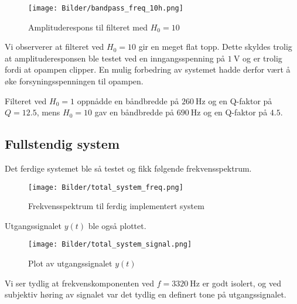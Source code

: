 \begin{figure}[H]
    \centering
    \texttt{[image: Bilder/bandpass\_freq\_10h.png]}
    \caption{Amplituderespons til filteret med $H_0 = 10$}
\end{figure}

Vi observerer at filteret ved $H_0 = 10$ gir en meget flat topp. Dette skyldes trolig at amplituderesponsen ble testet ved 
en inngangsspenning på $\SI{1}{\volt}$ og er trolig fordi at opampen clipper. En mulig forbedring av systemet hadde derfor vært 
å øke forsyningsspenningen til opampen.

Filteret ved $H_0 = 1$ oppnådde en båndbredde på $\SI{260}{\hertz}$ og en Q-faktor på $Q = 12.5$, mens 
$H_0 = 10$ gav en båndbredde på $\SI{690}{\hertz}$ og en Q-faktor på $4.5$. 

\subsection{Fullstendig system}
Det ferdige systemet ble så testet og fikk følgende frekvensspektrum.
\begin{figure}[H]
    \centering
    \texttt{[image: Bilder/total\_system\_freq.png]}
    \caption{Frekvensspektrum til ferdig implementert system}
\end{figure}

Utgangssignalet $y(t)$ ble også plottet.
\begin{figure}[H]
    \centering
    \texttt{[image: Bilder/total\_system\_signal.png]}
    \caption{Plot av utgangssignalet $y(t)$}
\end{figure}

Vi ser tydlig at frekvenskomponenten ved $f = \SI{3320}{\hertz}$ er godt isolert, og ved subjektiv høring av 
signalet var det tydlig en definert tone på utgangssignalet.
